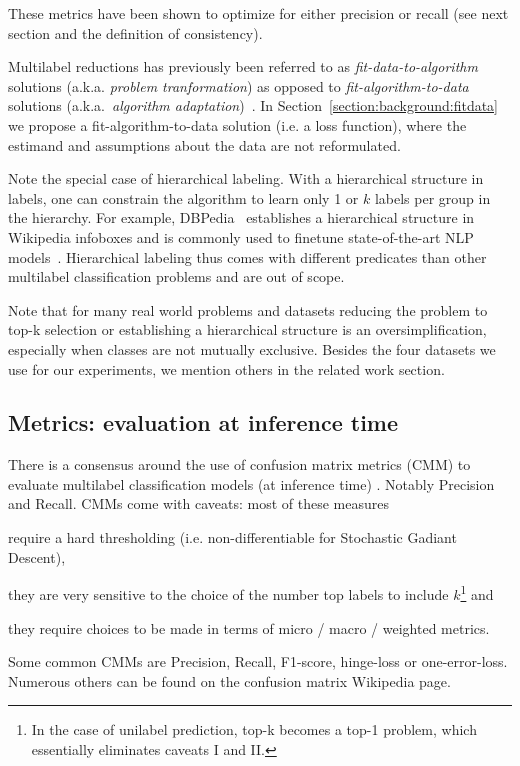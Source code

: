 These  metrics have been shown to optimize for either precision or recall (see next section and the definition of consistency).

Multilabel reductions has previously been referred to as \emph{fit-data-to-algorithm} solutions (a.k.a. \emph{problem tranformation}) as opposed to \emph{fit-algorithm-to-data} solutions (a.k.a.\ \emph{algorithm adaptation})~\cite{multilabelReview, multilabelReview2}. In Section~\ref{section:background:fitdata} we propose a fit-algorithm-to-data solution (i.e. a loss function), where the estimand and assumptions about the data are not reformulated.

 Note the special case of hierarchical labeling. With a hierarchical structure in labels, one can constrain the algorithm to learn only 1 or $k$ labels per group in the hierarchy. For example, DBPedia~\citep{lehmann2015dbpedia} establishes a hierarchical structure in Wikipedia infoboxes and is commonly used to finetune state-of-the-art NLP models~\citep[see, e.g.,][]{XLNet, ULMFit}. Hierarchical labeling thus comes with different predicates than other multilabel classification problems and are out of scope.

Note that for many real world problems and datasets reducing the problem to top-k selection or establishing a hierarchical structure is an oversimplification, especially when classes are not mutually exclusive. Besides the four datasets we use for our experiments, we mention others in the related work section.

\subsection{Metrics: evaluation at inference time}
\label{section:background:metrics}

There is a consensus around the use of confusion matrix metrics (CMM) to evaluate multilabel classification models (at inference time) . Notably Precision and Recall. CMMs come with caveats: most of these measures 
\begin{enumerate*}
\item require a hard thresholding (i.e. non-differentiable for Stochastic Gadiant Descent), 
\item they are very sensitive to the choice of the number top labels to include $k$\footnote{In the case of unilabel prediction, top-k becomes a top-1 problem, which essentially eliminates caveats I and II.} and 
\item they require choices to be made in terms of  micro / macro / weighted metrics.
\end{enumerate*}
Some common CMMs are Precision, Recall, F1-score, hinge-loss or one-error-loss. Numerous others can be found on the confusion matrix Wikipedia page.

